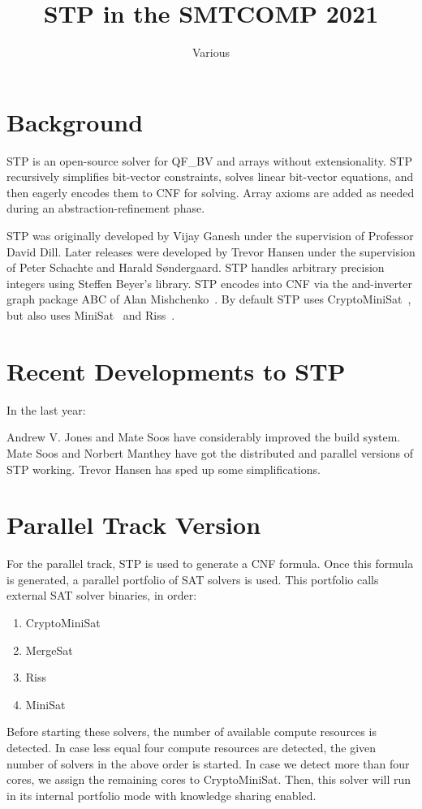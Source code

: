 \documentclass{easychair}
\begin{document}
\title{STP in the SMTCOMP 2021}
\author{Various}
\institute{}

\maketitle
\thispagestyle{empty}
\pagestyle{empty}

\section{Background}
STP\cite{Vijay:Thesis:2007} is an open-source solver for QF\_BV and arrays without extensionality. 
STP recursively simplifies bit-vector constraints, solves linear bit-vector equations, and then eagerly encodes them to CNF for solving. 
Array axioms are added as needed during an abstraction-refinement phase.

STP was originally developed by Vijay Ganesh under the supervision of Professor David Dill. 
Later releases were developed by Trevor Hansen under the supervision of Peter Schachte and Harald Søndergaard. 
STP handles arbitrary precision integers using Steffen Beyer's library. 
STP encodes into CNF via the and-inverter graph package ABC of Alan Mishchenko~\cite{Brayton:2010:AAI:2144310.2144317}.
By default STP uses CryptoMiniSat~\cite{CMS:github}, but also uses MiniSat~\cite{MiniSat:github} and Riss~\cite{Riss:github}.

\section{Recent Developments to STP}
In the last year:

Andrew V. Jones and Mate Soos have considerably improved the build system. 
Mate Soos and Norbert Manthey have got the distributed and parallel versions of STP working. 
Trevor Hansen has sped up some simplifications.

\section{Parallel Track Version}

For the parallel track, STP is used to generate a CNF formula.
Once this formula is generated, a parallel portfolio of SAT solvers is used.
This portfolio calls external SAT solver binaries, in order:
%
\begin{enumerate}
 \item CryptoMiniSat~\cite{CMS:github}
 \item MergeSat~\cite{MergeSAT:github}
 \item Riss~\cite{Riss:github}
 \item MiniSat~\cite{MiniSat:github}
\end{enumerate}
%
Before starting these solvers, the number of available compute resources is detected.
In case less equal four compute resources are detected, the given number of solvers in the above order is started.
In case we detect more than four cores, we assign the remaining cores to CryptoMiniSat.
Then, this solver will run in its internal portfolio mode with knowledge sharing enabled.
\end{document}
